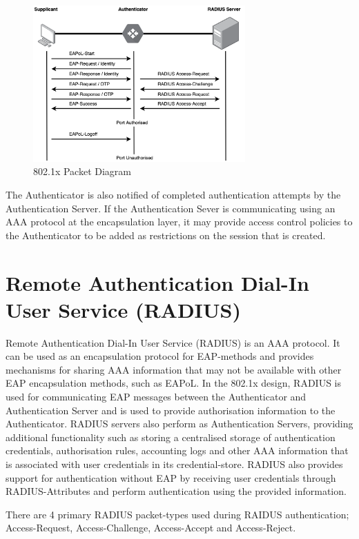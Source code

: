 \begin{figure}\begin{center}
    \includegraphics[height=6cm]{images/dot1x_packet_diagram.png}
    \caption{802.1x Packet Diagram}
    \label{fig:802_packets}
\end{center}\end{figure}

The Authenticator is also notified of completed authentication attempts by the Authentication Server. If the Authentication Sever is communicating using an AAA protocol at the encapsulation layer, it may provide access control policies to the Authenticator to be added as restrictions on the session that is created.

\section{Remote Authentication Dial-In User Service (RADIUS)}\label{sec:radius_packets}
Remote Authentication Dial-In User Service (RADIUS) is an AAA protocol. It can be used as an encapsulation protocol for EAP-methods and provides mechanisms for sharing AAA information that may not be available with other EAP encapsulation methods, such as EAPoL. 
In the 802.1x design, RADIUS is used for communicating EAP messages between the Authenticator and Authentication Server and is used to provide authorisation information to the Authenticator.
RADIUS servers also perform as Authentication Servers, providing additional functionality such as storing a centralised storage of authentication credentials, authorisation rules, accounting logs and other AAA information that is associated with user credentials in its credential-store. \cite{rfc_2904}
RADIUS also provides support for authentication without EAP by receiving user credentials through RADIUS-Attributes and perform authentication using the provided information.

There are 4 primary RADIUS packet-types used during RAIDUS authentication; Access-Request, Access-Challenge, Access-Accept and Access-Reject.

